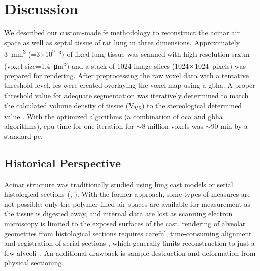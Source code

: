 \section{Discussion}\label{sec:discussion}
We described our custom-made \ac{fe} methodology to reconstruct the acinar air space as well as septal tissue of rat lung in three dimensions. Approximately \SI{3}{\milli\meter\cubed} (=3$\times10^9$~\micro\meter$^3$) of fixed lung tissue was scanned with high resolution \ac{srxtm} (voxel size=\SI{1.4}{\micro\meter\cubed}) and a stack of 1024 image slices (1024$\times$1024~pixels) was prepared for \threed rendering. After preprocessing the raw voxel data with a tentative threshold level, \threed \acp{fe} were created overlaying the voxel map using a \ac{gbha}. A proper threshold value for adequate segmentation was iteratively determined to match the calculated volume density of tissue (V\textsubscript{VS}) to the stereological determined value \cite{Tschanz2003}. With the optimized algorithms (a combination of \ac{oca} and \ac{gbha} algorithms), \acs{cpu} time for one iteration for $\sim$8 million voxels was $\sim$90 min by a standard \acs{pc}.

\subsection{Historical Perspective}
Acinar structure was traditionally studied using lung cast models \cite{Boyden1971,Haefeli1988,Schreider1981} or serial histological sections (\eg, \cite{Berend1991,Hansen1975,Hansen1975a,Parker1971,Randell1989}). With the former approach, some types of measures are not possible: only the polymer-filled air spaces are available for measurement as the tissue is digested away, and internal data are lost as scanning electron microscopy is limited to the exposed surfaces of the cast. \threed rendering of alveolar geometries from histological sections requires careful, time-consuming alignment and registration of serial \twod sections \cite{Mercer1987,Mercer1987a,Stelter1966}, which generally limits reconstruction to just a few alveoli~\cite{Mercer1987}. An additional drawback is sample destruction and deformation from physical sectioning.

